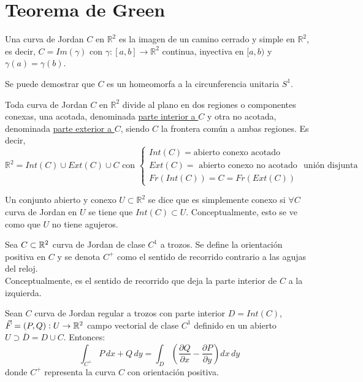 \section{Teorema de Green}
\begin{definición}
    Una curva de Jordan $C$ en $\mathbb{R}^2$ es la imagen de un camino cerrado y simple en $\mathbb{R}^2$, es decir, $C = Im(\gamma)$ con $\gamma: [a,b] \to \mathbb{R}^2$ continua, inyectiva en $[a, b)$ y $\gamma(a) = \gamma(b)$.
    \end{definición}
    \begin{observación}
    Se puede demostrar que $C$ es un homeomorfa a la circunferencia unitaria $S^1$.
    \end{observación}
    \begin{teorema}
        Toda curva de Jordan $C$ en $\mathbb{R}^2$ divide al plano en dos regiones  o componentes conexas, una acotada, denominada \underline{parte interior a $C$} y otra no acotada, denominada \underline{parte exterior a $C$}, siendo $C$ la frontera común a ambas regiones. Es decir,
        $$\mathbb{R}^2 = Int(C) \cup Ext(C) \cup C \text{ con } \begin{cases}
                Int(C) = \text{abierto conexo acotado} \\ Ext(C) = \text{ abierto conexo no acotado} \\ Fr(Int(C)) = C = Fr(Ext(C))
            \end{cases} \text{ unión disjunta}$$
    \end{teorema}
    \begin{definición}
    Un conjunto abierto y conexo $U \subset \mathbb{R}^2$ se dice que es simplemente conexo si $\forall C$ curva de Jordan en $U$ se tiene que $Int(C) \subset U$. Conceptualmente, esto se ve como que $U$ no tiene agujeros.
    \end{definición}
    
    \begin{definición}
    Sea $C \subset \mathbb{R}^2$ curva de Jordan de clase $C^1$ a trozos. Se define la orientación positiva en $C$ y se denota $C^+$ como el sentido de recorrido contrario a las agujas del reloj. \\
    Conceptualmente, es el sentido de recorrido que deja la parte interior de $C$ a la izquierda.
    \end{definición}
    
    \begin{teorema}
        Sean $C$ curva de Jordan regular a trozos con parte interior $D = Int(C)$, $\vec{F} = (P, Q) : U \to \mathbb{R}^2$ campo vectorial de clase $C^1$ definido en un abierto $U \supset \overline{D} = D \cup C$. Entonces:
        $$\int_{C^+} P \, dx + Q \, dy = \int_{D} \left(\frac{\partial Q}{\partial x} - \frac{\partial P}{\partial y}\right) dx \, dy
        $$
        donde $C^+$ representa la curva $C$ con orientación positiva.
    \end{teorema}
    
